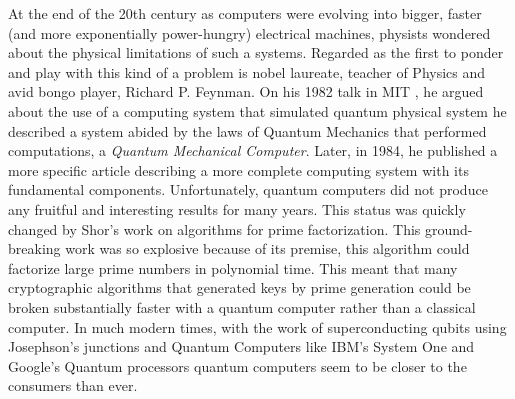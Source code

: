 
At the end of the 20th century as computers were evolving into bigger, faster (and more exponentially power-hungry) electrical machines,
physists wondered about the physical limitations of such a systems. Regarded as the first to ponder and play with this kind of a problem is
nobel laureate, teacher of Physics and avid bongo player, Richard P. Feynman. On his 1982 talk in MIT \cite{Feynman1982}, he argued about the
use of a computing system that simulated quantum physical system he described a system abided by the laws of Quantum Mechanics that performed
computations, a \textit{Quantum Mechanical Computer}. Later, in 1984, he published a more specific article \cite{Feynman1984} describing a
more complete computing system with its fundamental components. Unfortunately, quantum computers did not produce any fruitful
and interesting results for many years. This status was quickly changed by Shor's work \cite{Shor1997} on algorithms for prime factorization.
This ground-breaking work was so explosive because of its premise, this algorithm could factorize large prime numbers in polynomial time.
This meant that many cryptographic algorithms that generated keys by prime generation could be broken substantially faster with a quantum
computer rather than a classical computer. In much modern times, with the work of superconducting qubits using Josephson's junctions
\cite{JOSEPHSON1962251} and Quantum Computers like IBM's System One \cite{IBMQuantum2021} and Google's Quantum processors \cite{Google2014}
quantum computers seem to be closer to the consumers than ever.